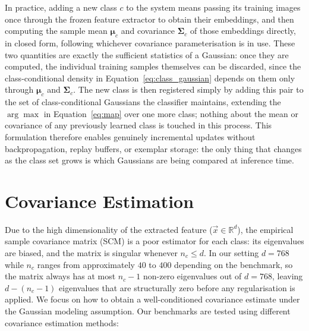 In practice, adding a new class $c$ to the system means passing its training images once through the frozen feature extractor to obtain their embeddings, and then computing the sample mean $\boldsymbol{\mu}_c$ and covariance $\boldsymbol{\Sigma}_c$ of those embeddings directly, in closed form, following whichever covariance parameterisation is in use. These two quantities are exactly the sufficient statistics of a Gaussian: once they are computed, the individual training samples themselves can be discarded, since the class-conditional density in Equation~\eqref{eq:class_gaussian} depends on them only through $\boldsymbol{\mu}_c$ and $\boldsymbol{\Sigma}_c$. The new class is then registered simply by adding this pair to the set of class-conditional Gaussians the classifier maintains, extending the $\arg\max$ in Equation~\eqref{eq:map} over one more class; nothing about the mean or covariance of any previously learned class is touched in this process. This formulation therefore enables genuinely incremental updates without backpropagation, replay buffers, or exemplar storage: the only thing that changes as the class set grows is which Gaussians are being compared at inference time.

\section{Covariance Estimation}
\label{sec:covariance_estimation}

Due to the high dimensionality of the extracted feature ($\vec{x}\in \mathbb{R}^d$), the empirical sample covariance matrix (SCM) is a poor estimator for each class: its eigenvalues are biased, and the matrix is singular whenever $n_c \leq d$. In our setting $d = 768$ while $n_c$ ranges from approximately $40$ to $400$ depending on the benchmark, so the matrix always has at most $n_c - 1$ non-zero eigenvalues out of $d = 768$, leaving $d - (n_c - 1)$ eigenvalues that are structurally zero before any regularisation is applied. We focus on how to obtain a well-conditioned covariance estimate under the Gaussian modeling assumption. Our benchmarks are tested using different covariance estimation methods:

